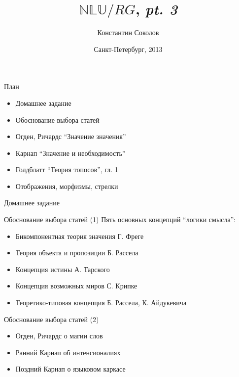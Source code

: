 \documentclass{beamer}
\begin{document}
\title{\huge{$\mathbb{NLU}/RG$, \textit{pt. 3}}}
\author{Константин Соколов}
\date{Санкт-Петербург, 2013} 
\begin{frame}
    \thispagestyle{empty}
    \titlepage
\end{frame}

\begin{frame}{План}
    \setcounter{framenumber}{1}
    \begin{itemize}
        \item Домашнее задание
        \item Обоснование выбора статей
        \item Огден, Ричардс ``Значение значения''
        \item Карнап ``Значение и необходимость''
        \item Голдблатт ``Теория топосов'', гл. 1
        \item Отображения, морфизмы, стрелки
    \end{itemize}
\end{frame}

\begin{frame}{Домашнее задание}
\end{frame}

\begin{frame}{Обоснование выбора статей (1)}
Пять основных концепций ``логики смысла'':\\
  \begin{itemize}
    \item Бикомпонентная теория значения Г. Фреге
    \item Теория объекта и пропозиции Б. Рассела
    \item Концепция истины А. Тарского
    \item Концепция возможных миров С. Крипке
    \item Теоретико-типовая концепция Б. Рассела, К. Айдукевича
  \end{itemize}
\end{frame}

\begin{frame}{Обоснование выбора статей (2)}
  \begin{itemize}
    \item Огден, Ричардс о магии слов
    \item Ранний Карнап об интенсионалиях
    \item Поздний Карнап о языковом каркасе
  \end{itemize}
\end{frame}
\end{document}

